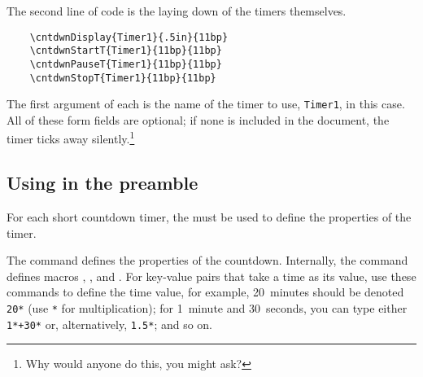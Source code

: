 \documentclass{article}
\begin{document}
The second line of code is the laying down of the timers themselves.
\begin{verbatim}
    \cntdwnDisplay{Timer1}{.5in}{11bp}
    \cntdwnStartT{Timer1}{11bp}{11bp}
    \cntdwnPauseT{Timer1}{11bp}{11bp}
    \cntdwnStopT{Timer1}{11bp}{11bp}
\end{verbatim}
The first argument of each is the name of the timer to use,
\texttt{Timer1},  in this case. All of these form fields are optional; if
none is included in the document, the timer ticks away
silently.\footnote{Why would anyone do this, you might ask?}

\subsection{Using \texorpdfstring{\protect{}}{}
in the preamble}

For each short countdown timer, the  must be used to
define the properties of the timer.
\begin{dCmd*}{.6\linewidth}
\end{dCmd*}
\CmdDescription The command defines the properties of the countdown.
Internally, the command defines macros , ,
and . For key-value pairs that take a time as its value, use
these commands to define the time value, for example, 20~minutes should be
denoted \texttt{20*} (use \texttt{*} for multiplication); for
1~minute and 30~seconds, you can type either \texttt{1*+\texttt{30*}}
or, alternatively, \texttt{1.5*}; and so on.
\end{document}
